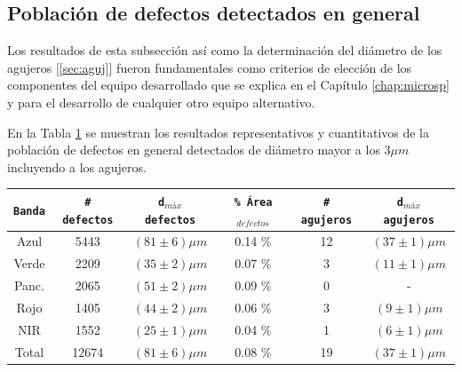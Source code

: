 \subsection{Población de defectos detectados en general}
\label{sec:defpob}

\hspace{0.5cm}Los resultados de esta subsección así como la determinación del diámetro de los agujeros [\ref{sec:aguj}] fueron fundamentales como criterios de elección de los componentes del equipo desarrollado que se explica en el Capítulo \ref{chap:microsp} y para el desarrollo de cualquier otro equipo alternativo.

En la Tabla \ref{tabpobb} se muestran los resultados representativos y cuantitativos de la población de defectos en general detectados de diámetro mayor a los $3\mu m$ incluyendo a los agujeros.

\begin{table}[H]
\begin{center}
\begin{tabular}{ |c|c|c|c|c|c|}    \toprule
\texttt{Banda} &  \texttt{\# defectos} & \texttt{d$_{máx}$ defectos} & \texttt{\% Área$_{defectos}$} & \texttt{\# agujeros} & \texttt{d$_{máx}$ agujeros} \\\midrule
\rowcolor{blue!15} Azul   & 5443 & $(81 \pm 6) \mu m$ & 0.14 \% &12  & $(37 \pm 1) \mu m$  \\ 
\rowcolor{green!50} Verde  & 2209 & $(35 \pm 2) \mu m$ & 0.07 \% &3 & $(11 \pm 1) \mu m$\\ 
Panc. & 2065 & $(51 \pm 2) \mu m$ & 0.09 \% &0 & -\\
\rowcolor{red!50} Rojo  & 1405  &$(44 \pm 2) \mu m$& 0.06 \% &3 & $(9 \pm 1) \mu m$\\
\rowcolor{maroon!20} NIR   & 1552 & $(25 \pm 1) \mu m$ & 0.04 \% &1 & $(6 \pm 1) \mu m$ \\ \midrule
Total   & 12674 & $(81 \pm 6) \mu m$ & 0.08 \% & 19 & $(37 \pm 1) \mu m$ \\
\bottomrule
 \hline
\end{tabular}
\end{center}
 \label{tabpobb}
\end{table}

